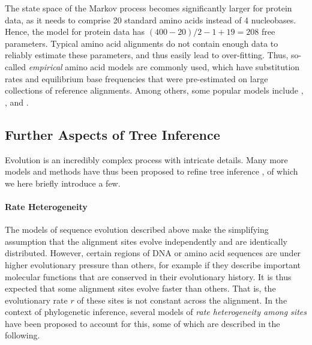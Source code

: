 The state space of the Markov process becomes significantly larger for protein data,
as it needs to comprise \num{20} standard amino acids instead of \num{4} nucleobases.
Hence, the  model for protein data has $(400 - 20) / 2 - 1 + 19 = 208$ free parameters.
Typical amino acid alignments do not contain enough data to reliably estimate these parameters,
and thus easily lead to over-fitting.
Thus, so-called \emph{empirical} amino acid models are commonly used,
which have substitution rates and equilibrium base frequencies
that were pre-estimated on large collections of reference alignments.
Among others, some popular models include  \cite{Dayhoff1978},
 \cite{Whelan2001}, and  \cite{Le2008}.


\subsection{Further Aspects of Tree Inference}
\label{ch:Foundations:sec:MLTreeInference:sub:FurtherAspects}

Evolution is an incredibly complex process with intricate details.
Many more models and methods have thus been proposed to refine tree inference \cite{Yang2014},
of which we here briefly introduce a few.

\paragraph{Rate Heterogeneity}
\label{ch:Foundations:sec:MLTreeInference:sub:FurtherAspects:par:RateHeterogeneity}

The models of sequence evolution described above make the simplifying assumption
that the alignment sites evolve independently and are identically distributed.
However, certain regions of DNA or amino acid sequences are under higher evolutionary pressure than others,
for example if they describe important molecular functions that are conserved in their evolutionary history.
It is thus expected that some alignment sites evolve faster than others.
That is, the evolutionary rate $r$ of these sites is not constant across the alignment.
In the context of phylogenetic inference,
several models of \emph{rate heterogeneity among sites} have been proposed to account for this,
some of which are described in the following.

